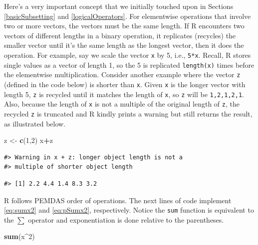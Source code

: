 \documentclass[
  11pt,
]{krantz}
\newenvironment{Shaded}{\begin{snugshade}}{\end{snugshade}}
\newcommand{\DecValTok}[1]{\textcolor[rgb]{0.00,0.00,0.81}{#1}}
\newcommand{\KeywordTok}[1]{\textcolor[rgb]{0.13,0.29,0.53}{\textbf{#1}}}
\newcommand{\NormalTok}[1]{#1}
\newcommand{\OperatorTok}[1]{\textcolor[rgb]{0.81,0.36,0.00}{\textbf{#1}}}
\newcommand{\StringTok}[1]{\textcolor[rgb]{0.31,0.60,0.02}{#1}}
\theoremstyle{definition}
\theoremstyle{definition}
\theoremstyle{definition}
\theoremstyle{definition}
\theoremstyle{remark}
\begin{document}
Here's a very important concept that we initially touched upon in Sections \ref{basicSubsetting} and \ref{logicalOperators}. For elementwise operations that involve two or more vectors, the vectors must be the same length. If R encounters two vectors of different lengths in a binary operation, it replicates (recycles) the smaller vector until it's the same length as the longest vector, then it does the operation. For example, say we scale the vector \texttt{x} by 5, i.e., \texttt{5*x}. Recall, R stores single values as a vector of length 1, so the 5 is replicated \texttt{length(x)} times before the elementwise multiplication. Consider another example where the vector \texttt{z} (defined in the code below) is shorter than \texttt{x}. Given \texttt{x} is the longer vector with length 5, \texttt{z} is recycled until it matches the length of \texttt{x}, so \texttt{z} will be \texttt{1,2,1,2,1}. Also, because the length of \texttt{x} is not a multiple of the original length of \texttt{z}, the recycled \texttt{z} is truncated and R kindly prints a warning but still returns the result, as illustrated below.

\begin{Shaded}
\begin{Highlighting}[]
\NormalTok{z \textless{}{-}}\StringTok{ }\KeywordTok{c}\NormalTok{(}\DecValTok{1}\NormalTok{,}\DecValTok{2}\NormalTok{)}
\NormalTok{x}\OperatorTok{+}\NormalTok{z}
\end{Highlighting}
\end{Shaded}

\begin{verbatim}
#> Warning in x + z: longer object length is not a
#> multiple of shorter object length
\end{verbatim}

\begin{verbatim}
#> [1] 2.2 4.4 1.4 8.3 3.2
\end{verbatim}

R follows PEMDAS order of operations. The next lines of code implement \eqref{eq:sumx2} and \eqref{eq:pSumx2}, respectively. Notice the \texttt{sum} function is equivalent to the \(\sum\) operator and exponentiation is done relative to the parentheses.

\begin{Shaded}
\begin{Highlighting}[]
\KeywordTok{sum}\NormalTok{(x}\OperatorTok{\^{}}\DecValTok{2}\NormalTok{)}
\end{Highlighting}
\end{Shaded}
\end{document}
